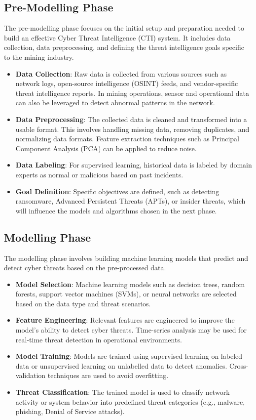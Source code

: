 \documentclass[a4paper,twoside,12pt]{report}
\begin{document}
\subsection{Pre-Modelling Phase}
The pre-modelling phase focuses on the initial setup and preparation needed to build an effective Cyber Threat Intelligence (CTI) system. It includes data collection, data preprocessing, and defining the threat intelligence goals specific to the mining industry.

\begin{itemize}
    \item \textbf{Data Collection}: Raw data is collected from various sources such as network logs, open-source intelligence (OSINT) feeds, and vendor-specific threat intelligence reports. In mining operations, sensor and operational data can also be leveraged to detect abnormal patterns in the network.
    \item \textbf{Data Preprocessing}: The collected data is cleaned and transformed into a usable format. This involves handling missing data, removing duplicates, and normalizing data formats. Feature extraction techniques such as Principal Component Analysis (PCA) can be applied to reduce noise.
    \item \textbf{Data Labeling}: For supervised learning, historical data is labeled by domain experts as normal or malicious based on past incidents.
    \item \textbf{Goal Definition}: Specific objectives are defined, such as detecting ransomware, Advanced Persistent Threats (APTs), or insider threats, which will influence the models and algorithms chosen in the next phase.
\end{itemize}

\subsection{Modelling Phase}
The modelling phase involves building machine learning models that predict and detect cyber threats based on the pre-processed data.

\begin{itemize}
    \item \textbf{Model Selection}: Machine learning models such as decision trees, random forests, support vector machines (SVMs), or neural networks are selected based on the data type and threat scenarios.
    \item \textbf{Feature Engineering}: Relevant features are engineered to improve the model’s ability to detect cyber threats. Time-series analysis may be used for real-time threat detection in operational environments.
    \item \textbf{Model Training}: Models are trained using supervised learning on labeled data or unsupervised learning on unlabelled data to detect anomalies. Cross-validation techniques are used to avoid overfitting.
    \item \textbf{Threat Classification}: The trained model is used to classify network activity or system behavior into predefined threat categories (e.g., malware, phishing, Denial of Service attacks).
\end{itemize}
\end{document}
